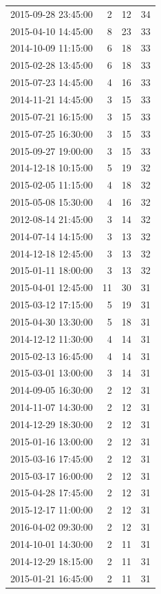 \begin{tabular}{lrrr}
2015-09-28 23:45:00 & 2 & 12 & 34 \\
2015-04-10 14:45:00 & 8 & 23 & 33 \\
2014-10-09 11:15:00 & 6 & 18 & 33 \\
2015-02-28 13:45:00 & 6 & 18 & 33 \\
2015-07-23 14:45:00 & 4 & 16 & 33 \\
2014-11-21 14:45:00 & 3 & 15 & 33 \\
2015-07-21 16:15:00 & 3 & 15 & 33 \\
2015-07-25 16:30:00 & 3 & 15 & 33 \\
2015-09-27 19:00:00 & 3 & 15 & 33 \\
2014-12-18 10:15:00 & 5 & 19 & 32 \\
2015-02-05 11:15:00 & 4 & 18 & 32 \\
2015-05-08 15:30:00 & 4 & 16 & 32 \\
2012-08-14 21:45:00 & 3 & 14 & 32 \\
2014-07-14 14:15:00 & 3 & 13 & 32 \\
2014-12-18 12:45:00 & 3 & 13 & 32 \\
2015-01-11 18:00:00 & 3 & 13 & 32 \\
2015-04-01 12:45:00 & 11 & 30 & 31 \\
2015-03-12 17:15:00 & 5 & 19 & 31 \\
2015-04-30 13:30:00 & 5 & 18 & 31 \\
2014-12-12 11:30:00 & 4 & 14 & 31 \\
2015-02-13 16:45:00 & 4 & 14 & 31 \\
2015-03-01 13:00:00 & 3 & 14 & 31 \\
2014-09-05 16:30:00 & 2 & 12 & 31 \\
2014-11-07 14:30:00 & 2 & 12 & 31 \\
2014-12-29 18:30:00 & 2 & 12 & 31 \\
2015-01-16 13:00:00 & 2 & 12 & 31 \\
2015-03-16 17:45:00 & 2 & 12 & 31 \\
2015-03-17 16:00:00 & 2 & 12 & 31 \\
2015-04-28 17:45:00 & 2 & 12 & 31 \\
2015-12-17 11:00:00 & 2 & 12 & 31 \\
2016-04-02 09:30:00 & 2 & 12 & 31 \\
2014-10-01 14:30:00 & 2 & 11 & 31 \\
2014-12-29 18:15:00 & 2 & 11 & 31 \\
2015-01-21 16:45:00 & 2 & 11 & 31 \\

\end{tabular}
